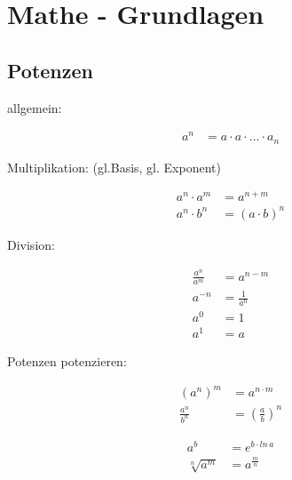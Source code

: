 


\section{Mathe - Grundlagen}\label{matheGrundlagen}




\subsection{Potenzen }\label{potenzen }

allgemein:

\begin{align}
a^n &= a \cdot a \cdot ... \cdot a_n
\end{align}

Multiplikation: (gl.Basis, gl. Exponent)

\begin{align}
a^n \cdot a^m &= a^{n+m} \\
a^n \cdot b^n &= (a \cdot b)^n
\end{align}

Division:

\begin{align}
\frac{a^n}{a^m} &= a^{n-m} \\
a^{-n}          &= \frac{1}{a^n}   \\
a^0 						&= 1 \\
a^1				      &= a
\end{align}

Potenzen potenzieren:

\begin{align}
(a^n)^m         &= a^{n \cdot m} \\
\frac{a^n}{b^n} &= \left(\frac{a}{b}\right)^n
\end{align}

\begin{align}
a^b        &= e^{b \cdot ln \, a} \\
\sqrt[n]{a^m} &= a^{\frac{m}{n}}
\end{align}
